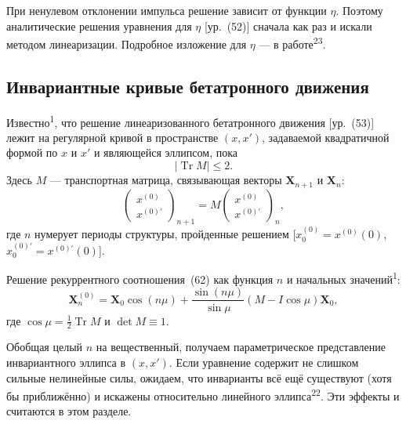 \documentclass[11pt,a4paper]{article}
\DeclareMathOperator{\Tr}{Tr}
\begin{document}
При ненулевом отклонении импульса решение зависит от функции $\eta$. Поэтому
аналитические решения уравнения для $\eta$ [ур.~(52)] сначала как раз и искали
методом линеаризации. Подробное изложение для $\eta$ --- в
работе\textsuperscript{23}.

\subsection{Инвариантные кривые бетатронного движения}

Известно\textsuperscript{1}, что решение линеаризованного бетатронного движения
[ур.~(53)] лежит на регулярной кривой в пространстве $(x,x')$, задаваемой
квадратичной формой по $x$ и $x'$ и являющейся эллипсом, пока
\begin{equation}
\bigl|\Tr M\bigr|\le 2.
\end{equation}
Здесь $M$ --- транспортная матрица, связывающая векторы $\mathbf{X}_{n+1}$ и
$\mathbf{X}_n$:
\begin{equation}
\begin{pmatrix}x^{(0)}\\ x^{(0)\prime}\end{pmatrix}_{n+1}
=M
\begin{pmatrix}x^{(0)}\\ x^{(0)\prime}\end{pmatrix}_{n},
\end{equation}
где $n$ нумерует периоды структуры, пройденные решением
[$x_0^{(0)}=x^{(0)}(0)$, $x_0^{(0)\prime}=x^{(0)\prime}(0)$].

Решение рекуррентного соотношения~(62) как функция $n$ и начальных значений\textsuperscript{1}:
\begin{equation}
\mathbf{X}_n^{(0)}
=\mathbf{X}_0\cos(n\mu)+\frac{\sin(n\mu)}{\sin\mu}(M-I\cos\mu)\mathbf{X}_0,
\end{equation}
где $\cos\mu=\tfrac12\Tr M$ и $\det M\equiv 1$.

Обобщая целый $n$ на вещественный, получаем параметрическое представление
инвариантного эллипса в $(x,x')$. Если уравнение содержит не слишком сильные
нелинейные силы, ожидаем, что инварианты всё ещё существуют (хотя бы
приближённо) и искажены относительно линейного эллипса\textsuperscript{22}. Эти
эффекты и считаются в этом разделе.
\end{document}
